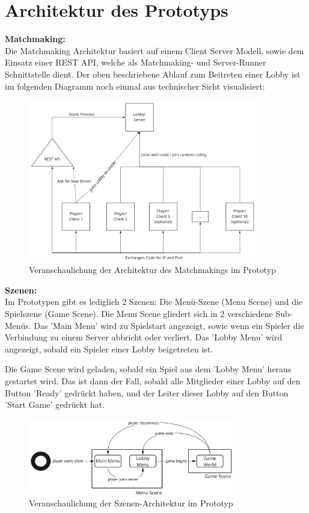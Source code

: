 \section{Architektur des Prototyps}
\label{Architektur}

\textbf{Matchmaking:} \\
Die Matchmaking Architektur basiert auf einem Client Server Modell, sowie dem Einsatz einer REST API, welche als Matchmaking- und Server-Runner Schnittstelle dient. Der oben beschriebene Ablauf zum Beitreten einer Lobby ist im folgenden Diagramm noch einmal aus technischer Sicht visualisiert:

\begin{figure}[H]
	\centering
	\includegraphics[width=100mm]{images/prototype_architecture_matchmaking.jpg}
	\caption[Architektur Matchmaking Diagramm]{Veranschaulichung der Architektur des Matchmakings im Prototyp}
	\label{pic:prototype_architecture_matchmaking}
\end{figure}

\textbf{Szenen:} \\
Im Prototypen gibt es lediglich 2 Szenen: Die Menü-Szene (Menu Scene) und die Spielszene (Game Scene).
Die Menu Scene gliedert sich in 2 verschiedene Sub-Menüs. Das 'Main Menu' wird zu Spielstart angezeigt, sowie wenn ein Spieler die Verbindung zu einem Server abbricht oder verliert. Das 'Lobby Menu' wird angezeigt, sobald ein Spieler einer Lobby beigetreten ist. 

Die Game Scene wird geladen, sobald ein Spiel aus dem 'Lobby Menu' heraus gestartet wird. Das ist dann der Fall, sobald alle Mitglieder einer Lobby auf den Button 'Ready' gedrückt haben, und der Leiter dieser Lobby auf den Button 'Start Game' gedrückt hat. 

\begin{figure}[H]
	\centering
	\includegraphics[width=90mm]{images/scene_architecture.jpg}
	\caption[Architektur Szenen Diagramm]{Veranschaulichung der Szenen-Architektur im Prototyp}
	\label{pic:scene_architecture}
\end{figure}

